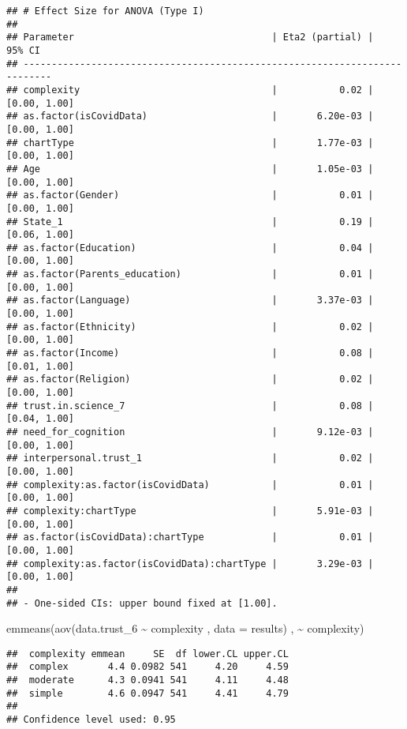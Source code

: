 \documentclass[
]{article}
\newenvironment{Shaded}{\begin{snugshade}}{\end{snugshade}}
\newcommand{\AttributeTok}[1]{\textcolor[rgb]{0.77,0.63,0.00}{#1}}
\newcommand{\FunctionTok}[1]{\textcolor[rgb]{0.00,0.00,0.00}{#1}}
\newcommand{\NormalTok}[1]{#1}
\newcommand{\SpecialCharTok}[1]{\textcolor[rgb]{0.00,0.00,0.00}{#1}}
\begin{document}
\begin{verbatim}
## # Effect Size for ANOVA (Type I)
## 
## Parameter                                   | Eta2 (partial) |       95% CI
## ---------------------------------------------------------------------------
## complexity                                  |           0.02 | [0.00, 1.00]
## as.factor(isCovidData)                      |       6.20e-03 | [0.00, 1.00]
## chartType                                   |       1.77e-03 | [0.00, 1.00]
## Age                                         |       1.05e-03 | [0.00, 1.00]
## as.factor(Gender)                           |           0.01 | [0.00, 1.00]
## State_1                                     |           0.19 | [0.06, 1.00]
## as.factor(Education)                        |           0.04 | [0.00, 1.00]
## as.factor(Parents_education)                |           0.01 | [0.00, 1.00]
## as.factor(Language)                         |       3.37e-03 | [0.00, 1.00]
## as.factor(Ethnicity)                        |           0.02 | [0.00, 1.00]
## as.factor(Income)                           |           0.08 | [0.01, 1.00]
## as.factor(Religion)                         |           0.02 | [0.00, 1.00]
## trust.in.science_7                          |           0.08 | [0.04, 1.00]
## need_for_cognition                          |       9.12e-03 | [0.00, 1.00]
## interpersonal.trust_1                       |           0.02 | [0.00, 1.00]
## complexity:as.factor(isCovidData)           |           0.01 | [0.00, 1.00]
## complexity:chartType                        |       5.91e-03 | [0.00, 1.00]
## as.factor(isCovidData):chartType            |           0.01 | [0.00, 1.00]
## complexity:as.factor(isCovidData):chartType |       3.29e-03 | [0.00, 1.00]
## 
## - One-sided CIs: upper bound fixed at [1.00].
\end{verbatim}

\begin{Shaded}
\begin{Highlighting}[]
\FunctionTok{emmeans}\NormalTok{(}\FunctionTok{aov}\NormalTok{(data.trust\_6 }\SpecialCharTok{\textasciitilde{}}\NormalTok{ complexity , }\AttributeTok{data =}\NormalTok{ results) , }\SpecialCharTok{\textasciitilde{}}\NormalTok{ complexity)}
\end{Highlighting}
\end{Shaded}

\begin{verbatim}
##  complexity emmean     SE  df lower.CL upper.CL
##  complex       4.4 0.0982 541     4.20     4.59
##  moderate      4.3 0.0941 541     4.11     4.48
##  simple        4.6 0.0947 541     4.41     4.79
## 
## Confidence level used: 0.95
\end{verbatim}
\end{document}
